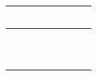 \begin{table}[h!]
\begin{tabulary}{\textwidth}{L|L|L|L|L|L|L}
	\                                 &                                     &                         &                            &                                         &                            & \\\hline
	\                                 &                                     &                         &                            &                                         &                            & \\\hline
	\                                 &                                     &                         &                            &                                         &                            & \\\hline
	\end{tabulary}
\caption{\label{tab:uyuy} \cite{raza_low_22a}}
\end{table}


